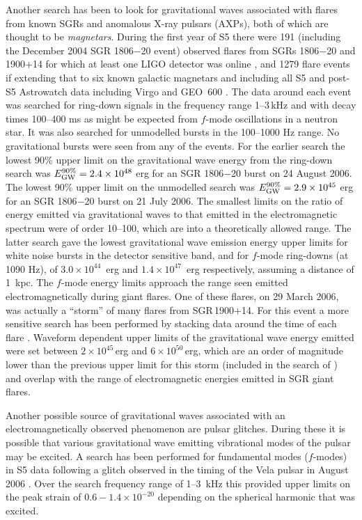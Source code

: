 \documentclass{article}
\begin{document}
Another search has been to look for gravitational waves associated with flares
from known SGRs and anomalous X-ray pulsars (AXPs), both of which are thought to
be {\it magnetars}. During the first year of 
S5 there were 191 (including the
December 2004 SGR 1806$-$20 event) observed flares from SGRs 1806$-$20 and
1900+14 for which at least one LIGO detector was online \cite{Abbott:2008h}, and 1279 flare events if
extending that to six known galactic magnetars and including all S5 and post-S5 Astrowatch 
data including Virgo and GEO~600 \cite{Abadie:2010c}. The
data around each event was searched for ring-down signals in the
frequency range 1--3\,kHz and with decay times 100--400 ms as might be expected
from $f$-mode oscillations in a neutron star. It was also searched for unmodelled
bursts in the 100--1000 Hz range. No gravitational bursts were seen from any of
the events. For the earlier search \cite{Abbott:2008h} the lowest 90\% upper 
limit on the gravitational wave energy from
the ring-down search was $E_{\rm GW}^{90\%} = 2.4\times10^{48}$ erg for an SGR
1806$-$20 burst on 24 August 2006. The lowest 90\% upper limit on the unmodelled
search was $E_{\rm GW}^{90\%} = 2.9\times10^{45}$ erg for an SGR 1806$-$20
burst on 21 July 2006. The smallest limits on the ratio of energy emitted via
gravitational waves to that emitted in the electromagnetic spectrum were of
order 10--100, which are into a theoretically allowed range. The latter search
\cite{Abadie:2010c} gave the lowest gravitational wave emission energy upper 
limits for white noise bursts in the detector sensitive band, 
and for $f$-mode ring-downs (at 1090 Hz), of $3.0\times10^{44}$~erg and $1.4\times10^{47}$~erg 
respectively, assuming a distance of 1~kpc. The $f$-mode energy limits approach the
range seen emitted electromagnetically during giant flares.
One of these flares, on 29 March 2006, was actually a ``storm'' of many flares 
from SGR\,1900+14. For this event a more sensitive search has been performed by stacking data
around the time of each flare \cite{Abbott:2009c}. Waveform dependent upper
limits of the gravitational wave energy emitted were set between
$2\times10^{45}$\,erg and $6\times10^{50}$\,erg, which are an order of magnitude
lower than the previous upper limit for this storm (included in the search 
of \cite{Abbott:2008h}) and overlap with the range of
electromagnetic energies emitted in SGR giant flares. 

Another possible source of gravitational waves associated with an  
electromagnetically observed phenomenon are pulsar glitches. During these it is
possible that various gravitational wave emitting vibrational modes of the
pulsar may be excited. A search has been performed for fundamental modes ($f$-modes) 
in S5 data following a glitch observed in the timing of the Vela pulsar 
in August 2006  \cite{Abadie:2010a}. Over the search frequency range of 
1--3~kHz this provided upper limits on the peak strain of $0.6-1.4\times10^{-20}$
depending on the spherical harmonic that was excited.
\end{document}
